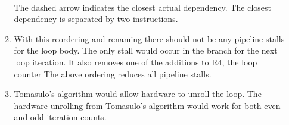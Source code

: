 \documentclass[12pt,a4]{article}
\begin{document}
\begin{enumerate}
\begin{enumerate}
        \\
        The dashed arrow indicates the closest actual dependency. 
        The closest dependency is separated by two instructions.
      \item
        With this reordering and renaming there should not be any pipeline stalls for the loop body.
        The only stall would occur in the branch for the next loop iteration.
        It also removes one of the additions to R4, the loop counter
        The above ordering reduces all pipeline stalls.
      \item
        Tomasulo's algorithm would allow hardware to unroll the loop.
        The hardware unrolling from Tomasulo's algorithm would work for both even and odd iteration counts.
    \end{enumerate}

\end{enumerate}
\end{document}

